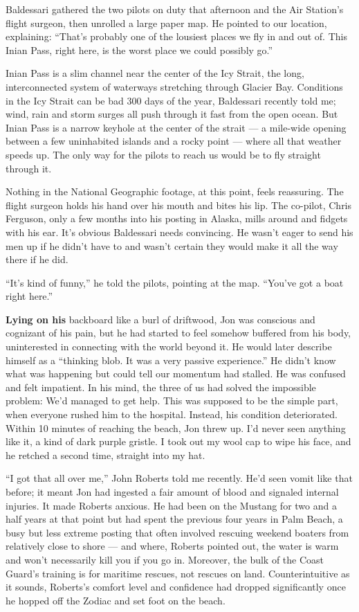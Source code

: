 Baldessari gathered the two pilots on duty that afternoon and the Air
Station's flight surgeon, then unrolled a large paper map. He pointed to
our location, explaining: ``That's probably one of the lousiest places
we fly in and out of. This Inian Pass, right here, is the worst place we
could possibly go.''

Inian Pass is a slim channel near the center of the Icy Strait, the
long, interconnected system of waterways stretching through Glacier Bay.
Conditions in the Icy Strait can be bad 300 days of the year, Baldessari
recently told me; wind, rain and storm surges all push through it fast
from the open ocean. But Inian Pass is a narrow keyhole at the center of
the strait --- a mile-wide opening between a few uninhabited islands and
a rocky point --- where all that weather speeds up. The only way for the
pilots to reach us would be to fly straight through it.

Nothing in the National Geographic footage, at this point, feels
reassuring. The flight surgeon holds his hand over his mouth and bites
his lip. The co-pilot, Chris Ferguson, only a few months into his
posting in Alaska, mills around and fidgets with his ear. It's obvious
Baldessari needs convincing. He wasn't eager to send his men up if he
didn't have to and wasn't certain they would make it all the way there
if he did.

``It's kind of funny,'' he told the pilots, pointing at the map.
``You've got a boat right here.''

\textbf{Lying on his} backboard like a burl of driftwood, Jon was
conscious and cognizant of his pain, but he had started to feel somehow
buffered from his body, uninterested in connecting with the world beyond
it. He would later describe himself as a ``thinking blob. It was a very
passive experience.'' He didn't know what was happening but could tell
our momentum had stalled. He was confused and felt impatient. In his
mind, the three of us had solved the impossible problem: We'd managed to
get help. This was supposed to be the simple part, when everyone rushed
him to the hospital. Instead, his condition deteriorated. Within 10
minutes of reaching the beach, Jon threw up. I'd never seen anything
like it, a kind of dark purple gristle. I took out my wool cap to wipe
his face, and he retched a second time, straight into my hat.

``I got that all over me,'' John Roberts told me recently. He'd seen
vomit like that before; it meant Jon had ingested a fair amount of blood
and signaled internal injuries. It made Roberts anxious. He had been on
the Mustang for two and a half years at that point but had spent the
previous four years in Palm Beach, a busy but less extreme posting that
often involved rescuing weekend boaters from relatively close to shore
--- and where, Roberts pointed out, the water is warm and won't
necessarily kill you if you go in. Moreover, the bulk of the Coast
Guard's training is for maritime rescues, not rescues on land.
Counterintuitive as it sounds, Roberts's comfort level and confidence
had dropped significantly once he hopped off the Zodiac and set foot on
the beach.

